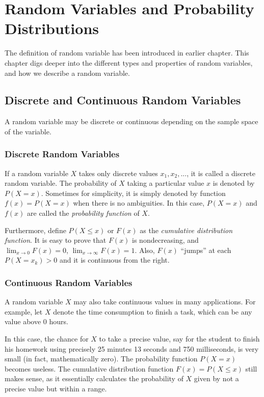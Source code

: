 \chapter{Random Variables and Probability Distributions} \label{ch:rv}

The definition of random variable has been introduced in earlier chapter. This chapter digs deeper into the different types and properties of random variables, and how we describe a random variable.

\section{Discrete and Continuous Random Variables}

A random variable may be discrete or continuous depending on the sample space of the variable.

\subsection{Discrete Random Variables}

If a random variable $X$ takes only discrete values $x_1, x_2, ...$, it is called a discrete random variable. 
The probability of $X$ taking a particular value $x$ is denoted by $P(X=x)$. Sometimes for simplicity, it is simply denoted by function $f(x)=P(X=x)$ when there is no ambiguities. In this case, $P(X=x)$ and $f(x)$ are called the \textit{probability function} of $X$.

Furthermore, define $P(X\leq x)$ or $F(x)$ as the \textit{cumulative distribution function}. It is easy to prove that $F(x)$ is nondecreasing, and $\lim_{x\rightarrow 0}F(x)=0$, $\lim_{x\rightarrow \infty}F(x)=1$. Also, $F(x)$ ``jumps'' at each $P(X=x_k)>0$ and it is continuous from the right.

\subsection{Continuous Random Variables}

A random variable $X$ may also take continuous values in many applications. For example, let $X$ denote the time consumption to finish a task, which can be any value above $0$ hours.

In this case, the chance for $X$ to take a precise value, say for the student to finish his homework using precisely 25 minutes 13 seconds and 750 milliseconds, is very small (in fact, mathematically zero). The probability function $P(X=x)$ becomes useless. The cumulative distribution function $F(x) = P(X\leq x)$ still makes sense, as it essentially calculates the probability of $X$ given by not a precise value but within a range.

